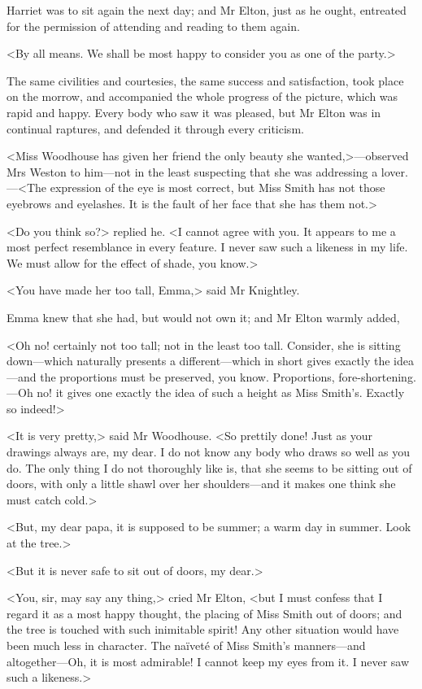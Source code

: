 Harriet was to sit again the next day; and Mr Elton, just as he ought, entreated for the permission of attending and reading to them again.

<By all means. We shall be most happy to consider you as one of the party.>

The same civilities and courtesies, the same success and satisfaction, took place on the morrow, and accompanied the whole progress of the picture, which was rapid and happy. Every body who saw it was pleased, but Mr Elton was in continual raptures, and defended it through every criticism.

<Miss Woodhouse has given her friend the only beauty she wanted,>—observed Mrs Weston to him—not in the least suspecting that she was addressing a lover.—<The expression of the eye is most correct, but Miss Smith has not those eyebrows and eyelashes. It is the fault of her face that she has them not.>

<Do you think so?> replied he. <I cannot agree with you. It appears to me a most perfect resemblance in every feature. I never saw such a likeness in my life. We must allow for the effect of shade, you know.>

<You have made her too tall, Emma,> said Mr Knightley.

Emma knew that she had, but would not own it; and Mr Elton warmly added,

<Oh no! certainly not too tall; not in the least too tall. Consider, she is sitting down—which naturally presents a different—which in short gives exactly the idea—and the proportions must be preserved, you know. Proportions, fore-shortening.—Oh no! it gives one exactly the idea of such a height as Miss Smith's. Exactly so indeed!>

<It is very pretty,> said Mr Woodhouse. <So prettily done! Just as your drawings always are, my dear. I do not know any body who draws so well as you do. The only thing I do not thoroughly like is, that she seems to be sitting out of doors, with only a little shawl over her shoulders—and it makes one think she must catch cold.>

<But, my dear papa, it is supposed to be summer; a warm day in summer. Look at the tree.>

<But it is never safe to sit out of doors, my dear.>

<You, sir, may say any thing,> cried Mr Elton, <but I must confess that I regard it as a most happy thought, the placing of Miss Smith out of doors; and the tree is touched with such inimitable spirit! Any other situation would have been much less in character. The naïveté of Miss Smith's manners—and altogether—Oh, it is most admirable! I cannot keep my eyes from it. I never saw such a likeness.>

